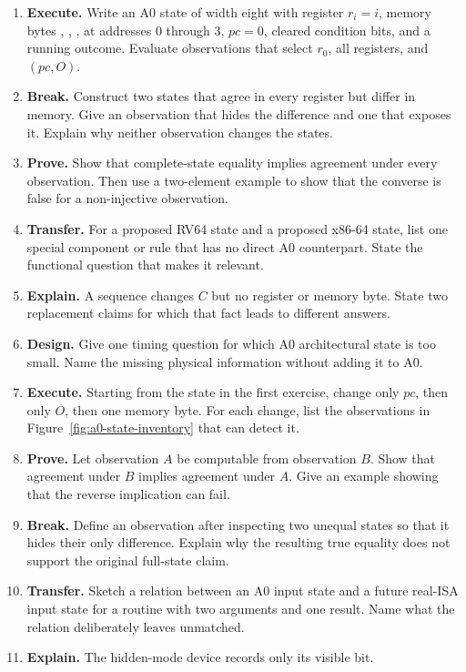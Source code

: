 \begin{enumerate}
\item \textbf{Execute.} Write an A0 state of width eight with register
\(r_i=i\), memory bytes , , ,  at
addresses 0 through 3, \(pc=0\), cleared condition bits, and a running
outcome. Evaluate observations that select \(r_0\), all
registers, and \((pc,O)\).
\item \textbf{Break.} Construct two states that agree in every register but
differ in memory. Give an observation that hides the difference and one that
exposes it. Explain why neither observation changes the states.
\item \textbf{Prove.} Show that complete-state equality implies agreement
under every observation. Then use a two-element example to show that the
converse is false for a non-injective observation.
\item \textbf{Transfer.} For a proposed RV64 state and a proposed x86-64
state, list one special component or rule that has no direct A0 counterpart.
State the functional question that makes it relevant.
\item \textbf{Explain.} A sequence changes \(C\) but no register or memory byte. State two
replacement claims for which that fact leads to different answers.
\item \textbf{Design.} Give one timing question for which A0 architectural state is too small.
Name the missing physical information without adding it to A0.
\item \textbf{Execute.} Starting from the state in the first exercise, change
only \(pc\), then only \(O\), then one memory byte. For each change, list the
observations in Figure~\ref{fig:a0-state-inventory} that can detect it.
\item \textbf{Prove.} Let observation \(A\) be computable from observation
\(B\). Show that agreement under \(B\) implies agreement under \(A\). Give an
example showing that the reverse implication can fail.
\item \textbf{Break.} Define an observation after inspecting two unequal
states so that it hides their only difference. Explain why the resulting true
equality does not support the original full-state claim.
\item \textbf{Transfer.} Sketch a relation between an A0 input state and a
future real-ISA input state for a routine with two arguments and one result.
Name what the relation deliberately leaves unmatched.
\item \textbf{Explain.} The hidden-mode device records only its visible bit.

\end{enumerate}
